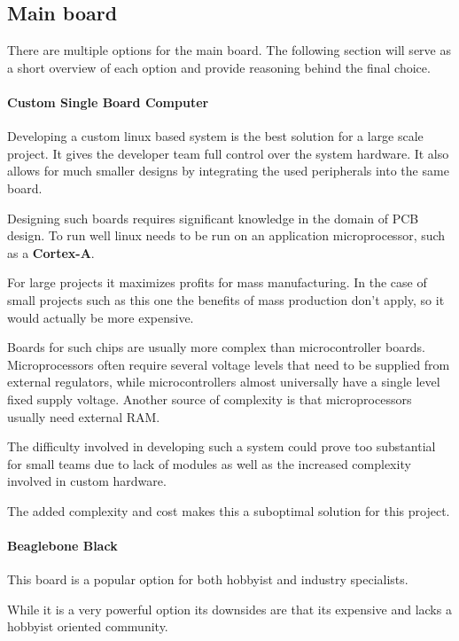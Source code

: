 \subsection{Main board}
There are multiple options for the main board.
The following section will serve as a short overview of each option
and provide reasoning behind the final choice.


\paragraph{Custom Single Board Computer}
Developing a custom linux based system is the best solution for a large scale project.
It gives the developer team full control over the system hardware. It also allows for much smaller designs by integrating the used peripherals into the same board.

Designing such boards requires significant knowledge in the domain of PCB design.
To run well linux needs to be run on an application microprocessor, such as a \textbf{Cortex-A}.

For large projects it maximizes profits for mass manufacturing.
In the case of small projects such as this one the benefits of mass production
don't apply, so it would actually be more expensive.

Boards for such chips are usually more complex than microcontroller boards.
Microprocessors often require several voltage levels that need to be supplied from external regulators, while microcontrollers almost universally have a single level fixed supply voltage.
Another source of complexity is that microprocessors usually need external RAM.~\cite{jay-carlson-embedded-linux}

The difficulty involved in developing such a system could prove too substantial
for small teams due to lack of modules as well as the increased complexity
involved in custom hardware.

The added complexity and cost makes this a suboptimal solution for this project.

\paragraph{Beaglebone Black}
This board is a popular option for both hobbyist and industry specialists.

While it is a very powerful option its downsides are that its expensive and
lacks a hobbyist oriented community.


